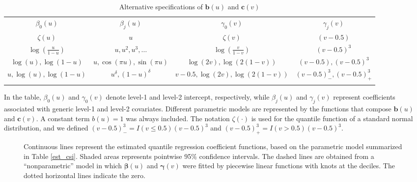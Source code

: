 \documentclass[12pt]{article}
\def\betavec{\bm{\beta}}
\def\gammavec{\bm{\gamma}}
\def\bvec{\bm{b}}
\def\cvec{\bm{c}}
\begin{document}

\begin{table}[h]
\caption{Alternative specifications of $\bvec(u)$ and $\cvec(v)$}
\label{spec}
\small
\centering
\begin{tabular}{cccc}
\noalign{\vspace{0.2cm}}
\hline
\hline
\noalign{\vspace{0.2cm}}
$\beta_0(u)$ & $\beta_j(u)$ & $\gamma_0(v)$ & $\gamma_j(v)$ \\
\noalign{\vspace{0.1cm}}
\cmidrule(lr){1-1}\cmidrule(lr){2-2}\cmidrule(lr){3-3}\cmidrule(lr){4-4}
$\zeta(u)$ & $u$ & $\zeta(v)$ & $(v - 0.5)$\\
$\log(\frac{u}{1 - u})$ & $u, u^2, u^3, \ldots$ & $\log(\frac{v}{1 - v})$ & $(v - 0.5)^3$\\
$\log(u), \log(1 - u)$ & $u, \cos(\pi u), \sin(\pi u)$ & $\log(2v), \log(2(1 - v))$ & $(v - 0.5), (v - 0.5)^3$\\
$u, \log(u), \log(1 - u)$ &  $u^{\delta}, (1 - u)^{\delta}$ & $v - 0.5, \log(2v), \log(2(1 - v))$ & $(v - 0.5)^3_{-}, (v - 0.5)^3_{+}$\\
\noalign{\vspace{0.1cm}}
\hline
\hline
\noalign{\vspace{0.1cm}}
\end{tabular}
\vspace{0.1cm}\footnotesize\center
In the table, $\beta_0(u)$ and $\gamma_0(v)$ denote level-1 and level-2 intercept, respectively,
while $\beta_j(u)$ and $\gamma_j(v)$ represent coefficients associated with generic level-1 and level-2
covariates. Different parametric models are represented by the functions that compose $\bvec(u)$ 
and $\cvec(v)$. A constant term $b(u) = 1$ was always included. 
The notation $\zeta(\cdot)$ is used for the quantile function of a standard normal distribution,
and we defined $(v - 0.5)^3_{-} = I(v \le 0.5)(v - 0.5)^3$ and $(v - 0.5)^3_{+} = I(v > 0.5)(v - 0.5)^3$.
\end{table}


\begin{figure}[h]
    \centering    
	\caption{\label{fig2}
	Continuous lines represent the estimated quantile regression coefficient functions, based on the parametric model
	summarized in Table \ref{est_csi}. Shaded areas represents pointwise 95$\%$ confidence intervals.
	The dashed lines are obtained from a ``nonparametric'' model in which
 	$\betavec(u)$ and $\gammavec(v)$ were fitted by piecewise linear functions with knots at the deciles.
	The dotted horizontal lines indicate the zero.}
\end{figure}
\end{document}
